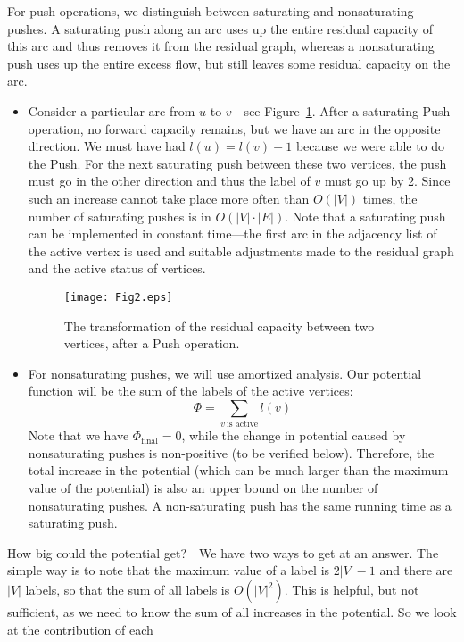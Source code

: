 \documentclass{article}
\begin{document}
For push operations, we distinguish between saturating and nonsaturating
pushes.  A saturating push along an arc uses up the entire residual
capacity of this arc and thus removes it from the residual graph,
whereas a nonsaturating push uses up the entire excess flow, but
still leaves some residual capacity on the arc.
\begin{itemize}
  \itemsep 0pt
  \item
    Consider a particular arc from $u$ to $v$---see Figure~\ref{fig:Fig2}.
    After a saturating Push operation, no forward capacity remains, but
    we have an arc in the opposite direction.  We must have had
    $l(u) = l(v) + 1$ because we were able to do the Push. For the next
    saturating push between these two vertices, the push must go in the 
    other direction and thus the label of $v$ must go up by 2.
    Since such an increase cannot take place more often than $O(|V|)$ times,
    the number of saturating pushes is in $O(|V|\cdot |E|)$.
    Note that a saturating push can be implemented in constant
    time---the first arc in the adjacency list of the active vertex is
    used and suitable adjustments made to the residual graph and the active
    status of vertices.
    \begin{figure}[h]%
      \centering\texttt{[image: Fig2.eps]}%
      \caption{The transformation of the residual capacity between two
        vertices, after a Push operation.}%
      \label{fig:Fig2}%
    \end{figure}%
  \item
    For nonsaturating pushes, we will use amortized analysis.
    Our potential function will be the sum of the labels of the
    active vertices:
      $$\Phi = \sum_{v~\text{is active}} l(v)$$
    Note that we have $\Phi_{\text{final}} = 0$, while the change in
    potential caused by nonsaturating pushes is non-positive (to be
    verified below).  Therefore, the total increase in the potential
    (which can be much larger than the maximum value of the potential)
    is also an upper bound on the number of nonsaturating pushes.
    A non-saturating push has the same running time as a saturating push.
\end{itemize}
How big could the potential get?\ \ We have two ways to get at an answer.
The simple way is to note that the maximum value of a label is $2|V|-1$
and there are $|V|$ labels, so that the sum of all labels is $O(|V|^2)$.
This is helpful, but not sufficient, as we need to know the sum of all
increases in the potential.  So we look at the contribution of each
\end{document}
